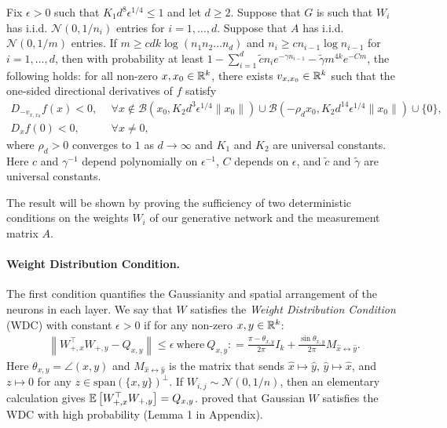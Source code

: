 \documentclass{article}
\begin{document}
\begin{thm}
Fix $\epsilon > 0$ such that $K_1d^8 \epsilon^{1/4} \leq 1$ and let $d \geq 2$. Suppose that $G$ is such that $W_i$ has i.i.d. $\mathcal{N}(0,1/n_i)$ entries for $i = 1,\dots,d$. Suppose that $A$ has i.i.d. $\mathcal{N}(0,1/m)$ entries. If $m \geq cdk \log (n_1n_2\dots n_d)$ and $n_i \geq c n_{i-1}\log n_{i-1}$ for $i =1,\dots,d$, then with probability at least $1 - \sum_{i=1}^d \tilde{c}n_ie^{-\gamma n_{i-1}} - \tilde{\gamma}m^{4k}e^{-Cm}$, the following holds: for all non-zero $x,x_0 \in \mathbb{R}^k$, there exists $v_{x,x_0} \in \mathbb{R}^k$ such that the one-sided directional derivatives of $f$ satisfy \begin{align*}
D_{-v_{x,x_0}}f(x) < 0,\ &\ \forall x \notin \mathcal{B}(x_0, K_2 d^3 \epsilon^{1/4}\|x_0\|) \cup \mathcal{B}(-\rho_d x_0, K_2 d^{14}\epsilon^{1/4}\|x_0\|) \cup \{0\}, \\
D_x f(0) < 0,\ &\ \forall x \neq 0,
\end{align*} where $\rho_d > 0$ converges to $1$ as $d \rightarrow \infty$ and $K_1$ and $K_2$ are universal constants. Here $c$ and $\gamma^{-1}$ depend polynomially on $\epsilon^{-1}$, $C$ depends on $\epsilon$, and $\tilde{c}$ and $\tilde{\gamma}$ are universal constants.
\end{thm}


The result will be shown by proving the sufficiency of two deterministic conditions on the weights $W_i$ of our generative network and the measurement matrix $A$. 

\paragraph{Weight Distribution Condition.} The first condition quantifies the Gaussianity and spatial arrangement of the neurons in each layer. We say that $W$ satisfies the \textit{Weight Distribution Condition} (WDC) with constant $\epsilon > 0$ if for any non-zero $x,y \in \mathbb{R}^k$: \begin{align*}
\left\|W_{+,x}^\top W_{+,y} - Q_{x,y}\right\| \leq \epsilon\ \text{where}\ Q_{x,y}: = \frac{\pi - \theta_{x,y}}{2\pi} I_k + \frac{\sin \theta_{x,y}}{2\pi} M_{\hat{x} \leftrightarrow \hat{y}}.
\end{align*} Here $\theta_{x,y} = \angle (x,y)$ and $M_{\hat{x} \leftrightarrow \hat{y}}$ is the matrix that sends $\hat{x} \mapsto \hat{y}$, $\hat{y} \mapsto \hat{x}$, and $z \mapsto 0$ for any $z \in \text{span}(\{x,y\})^{\perp}$. If $W_{i,j} \sim \mathcal{N}(0,1/n)$, then an elementary calculation gives $\operatorname{\mathbb{E}}\left[W_{+,x}^\top W_{+,y}\right] = Q_{x,y}$. \cite{Hand2017} proved that Gaussian $W$ satisfies the WDC with high probability (Lemma 1 in Appendix).
\end{document}
